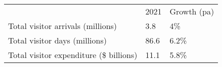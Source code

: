 \begin{tabular}[t]{p{4.7cm}>{\hfill}p{1.1cm}>{\hfill}p{1.7cm}}
   & 2021 & Growth (pa) \\ 
 Total visitor arrivals (millions) & 3.8 & 4\% \\ 
  Total visitor days (millions) & 86.6 & 6.2\% \\ 
  Total visitor expenditure (\$ billions) & 11.1 & 5.8\% \\ 
  \end{tabular}
